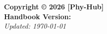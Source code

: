 \clearpage
\thispagestyle{empty}

\vspace*{\fill}

\noindent
\textbf{Copyright \copyright{} 2026 [Phy-Hub]}\\[0.5em]
\textbf{Handbook Version: \version} \\
\textit{Updated: \today}

\vspace{1.5em}

\noindent
\doclicenseThis

\clearpage